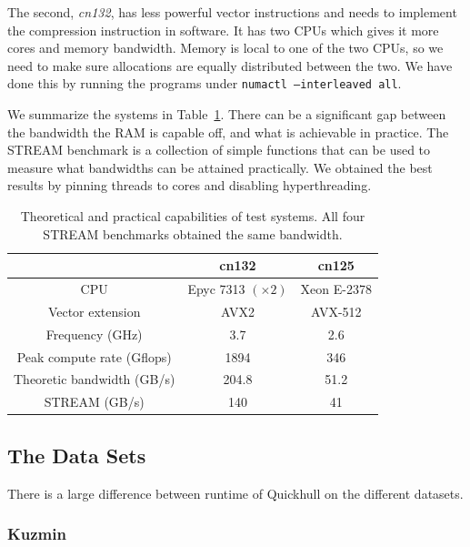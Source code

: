 The second, \textit{cn132}, has less powerful vector instructions and needs
to implement the compression instruction in software. It has two CPUs which
gives it more cores and memory bandwidth. Memory is local to one of the two
CPUs, so we need to make sure allocations are equally distributed between the
two. We have done this by running the programs under
\texttt{numactl --interleaved all}.

We summarize the systems in Table~\ref{tab:system}. There can be a significant
gap between the bandwidth the RAM is capable off, and what is achievable in
practice. The STREAM benchmark \cite{McCalpin95} is a collection of simple
functions that can be used to measure what bandwidths can be attained 
practically. We obtained the best results by pinning threads to cores and 
disabling hyperthreading.

\begin{table}[ht]
    \caption{Theoretical and practical capabilities of test systems. All four
             STREAM benchmarks obtained the same bandwidth.}
    \label{tab:system}
    \begin{tabular}{c|c|c}
                                   & cn132 & cn125          \\
        \hline                                              
        CPU                        & Epyc 7313 $(\times 2)$ 
                                           & Xeon E-2378    \\
        Vector extension           & AVX2  & AVX-512        \\
        Frequency (GHz)            & 3.7   & 2.6            \\
        Peak compute rate (Gflops) & 1894  & 346            \\
        Theoretic bandwidth (GB/s) & 204.8 & 51.2           \\ 
        STREAM (GB/s)              & 140   & 41             \\ 
    \end{tabular}
\end{table}

\subsection{The Data Sets}\label{subsec:datasets}

There is a large difference between runtime of Quickhull on the different 
datasets.

\subsubsection{Kuzmin}

